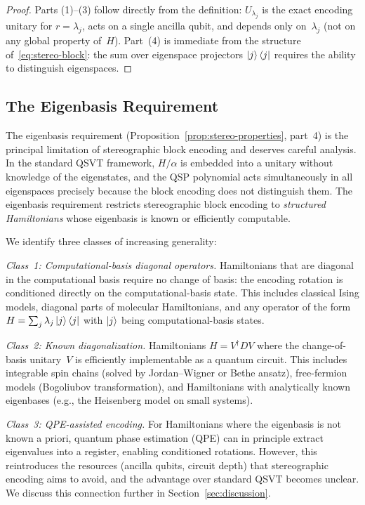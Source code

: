 \begin{proof}
	Parts (1)--(3) follow directly from the
	definition: $U_{\lambda_j}$ is the exact encoding
	unitary for $r = \lambda_j$, acts on a single ancilla
	qubit, and depends only on~$\lambda_j$ (not on any
	global property of~$H$).  Part~(4) is immediate from
	the structure of~\eqref{eq:stereo-block}: the sum over
	eigenspace projectors $\ket{j}\bra{j}$ requires the
	ability to distinguish eigenspaces.
\end{proof}

\subsection{The Eigenbasis Requirement}
\label{subsec:eigenbasis}

The eigenbasis requirement (Proposition~\ref{prop:stereo-properties},
part~4) is the principal limitation of stereographic block encoding
and deserves careful analysis.  In the standard QSVT framework,
$H/\alpha$ is embedded into a unitary without knowledge of the
eigenstates, and the QSP polynomial acts simultaneously in all
eigenspaces precisely because the block encoding does not
distinguish them.  The eigenbasis requirement restricts
stereographic block encoding to \emph{structured Hamiltonians}
whose eigenbasis is known or efficiently computable.

We identify three classes of increasing generality:

\textit{Class~1: Computational-basis diagonal operators.}
Hamiltonians that are diagonal in the computational basis require
no change of basis: the encoding rotation is conditioned directly
on the computational-basis state.  This includes classical Ising
models, diagonal parts of molecular Hamiltonians, and any operator
of the form $H = \sum_j \lambda_j \ket{j}\bra{j}$ with $\ket{j}$
being computational-basis states.

\textit{Class~2: Known diagonalization.}
Hamiltonians $H = V^\dagger D V$ where the change-of-basis
unitary~$V$ is efficiently implementable as a quantum circuit.
This includes integrable spin chains (solved by Jordan--Wigner or
Bethe ansatz), free-fermion models (Bogoliubov transformation),
and Hamiltonians with analytically known eigenbases (e.g., the
Heisenberg model on small systems).

\textit{Class~3: QPE-assisted encoding.}  For Hamiltonians where
the eigenbasis is not known a priori, quantum phase estimation
(QPE) can in principle extract eigenvalues into a register,
enabling conditioned rotations.  However, this reintroduces the
resources (ancilla qubits, circuit depth) that stereographic
encoding aims to avoid, and the advantage over standard QSVT
becomes unclear.  We discuss this connection further in
Section~\ref{sec:discussion}.

